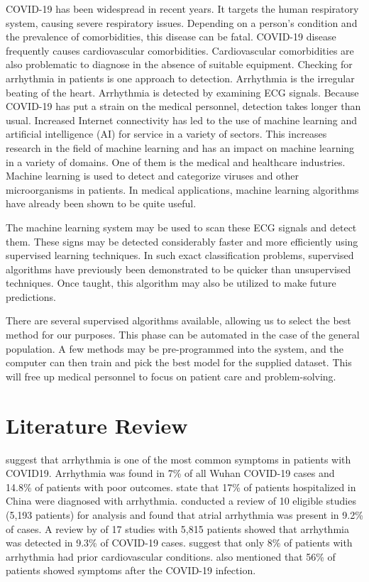 \documentclass[a4paper,fleqn]{cas-dc}
\begin{document}
COVID-19 has been widespread in recent years. It targets the human respiratory system, causing severe respiratory issues. Depending on a person's condition and the prevalence of comorbidities, this disease can be fatal. COVID-19 disease frequently causes cardiovascular comorbidities. Cardiovascular comorbidities are also problematic to diagnose in the absence of suitable equipment. Checking for arrhythmia in patients is one approach to detection. Arrhythmia is the irregular beating of the heart. Arrhythmia is detected by examining ECG signals. Because COVID-19 has put a strain on the medical personnel, detection takes longer than usual. Increased Internet connectivity has led to the use of machine learning and artificial intelligence (AI) for service in a variety of sectors. This increases research in the field of machine learning and has an impact on machine learning in a variety of domains. One of them is the medical and healthcare industries. Machine learning is used to detect and categorize viruses and other microorganisms in patients. In medical applications, machine learning algorithms have already been shown to be quite useful.

The machine learning system may be used to scan these ECG signals and detect them. These signs may be detected considerably faster and more efficiently using supervised learning techniques. In such exact classification problems, supervised algorithms have previously been demonstrated to be quicker than unsupervised techniques. Once taught, this algorithm may also be utilized to make future predictions.

There are several supervised algorithms available, allowing us to select the best method for our purposes. This phase can be automated in the case of the general population. A few methods may be pre-programmed into the system, and the computer can then train and pick the best model for the supplied dataset. This will free up medical personnel to focus on patient care and problem-solving.

\FloatBarrier
\section{Literature Review} \label{sec:literature_review}

\cite*{02_rp} suggest that arrhythmia is one of the most common symptoms in patients with COVID19. Arrhythmia was found in 7\% of all Wuhan COVID-19 cases and 14.8\% of patients with poor outcomes. \cite*{18_rp} state that 17\% of patients hospitalized in China were diagnosed with arrhythmia. \citeauthor{18_rp} conducted a review of 10 eligible studies (5,193 patients) for analysis and found that atrial arrhythmia was present in 9.2\% of cases. A review by \cite*{15_rp} of 17 studies with 5,815 patients showed that arrhythmia was detected in 9.3\% of COVID-19 cases. \cite*{25_rp} suggest that only 8\% of patients with arrhythmia had prior cardiovascular conditions. \citeauthor{25_rp} also mentioned that 56\% of patients showed symptoms after the COVID-19 infection.
\end{document}
